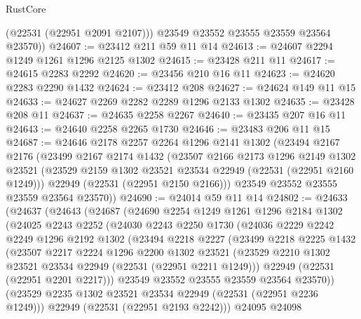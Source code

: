 \begin{lexlean}{RustCore}
\begin{coremodule}
          (@22531 (@22951 @2091 @2107)))
        @23549
        @23552
        @23555
        @23559
        @23564
        @23570))
@24607 := @23412 @211 @59 @11 @14
@24613 := @24607 @2294 @1249 @1261 @1296 @2125 @1302
@24615 := @23428 @211 @11
@24617 := @24615 @2283 @2292
@24620 := @23456 @210 @16 @11
@24623 := @24620 @2283 @2290 @1432
@24624 := @23412 @208
@24627 := @24624 @149 @11 @15
@24633 := @24627 @2269 @2282 @2289 @1296 @2133 @1302
@24635 := @23428 @208 @11
@24637 := @24635 @2258 @2267
@24640 := @23435 @207 @16 @11
@24643 := @24640 @2258 @2265 @1730
@24646 := @23483 @206 @11 @15
@24687 := @24646
    @2178
    @2257
    @2264
    @1296
    @2141
    @1302
    (@23494
      @2167
      @2176
      (@23499
        @2167
        @2174
        @1432
        (@23507
          @2166
          @2173
          @1296
          @2149
          @1302
          @23521
          (@23529 @2159 @1302 @23521 @23534 @22949 (@22531 (@22951 @2160 @1249)))
          @22949
          (@22531 (@22951 @2150 @2166)))
        @23549
        @23552
        @23555
        @23559
        @23564
        @23570))
@24690 := @24014 @59 @11 @14
@24802 := @24633
    (@24637
      (@24643
        (@24687
          (@24690
            @2254
            @1249
            @1261
            @1296
            @2184
            @1302
            (@24025
              @2243
              @2252
              (@24030
                @2243
                @2250
                @1730
                (@24036
                  @2229
                  @2242
                  @2249
                  @1296
                  @2192
                  @1302
                  (@23494
                    @2218
                    @2227
                    (@23499
                      @2218
                      @2225
                      @1432
                      (@23507
                        @2217
                        @2224
                        @1296
                        @2200
                        @1302
                        @23521
                        (@23529 @2210 @1302 @23521 @23534 @22949 (@22531 (@22951 @2211 @1249)))
                        @22949
                        (@22531 (@22951 @2201 @2217)))
                      @23549
                      @23552
                      @23555
                      @23559
                      @23564
                      @23570))
                  (@23529 @2235 @1302 @23521 @23534 @22949 (@22531 (@22951 @2236 @1249)))
                  @22949
                  (@22531 (@22951 @2193 @2242)))
                @24095
                @24098

\end{coremodule}
\end{lexlean}
